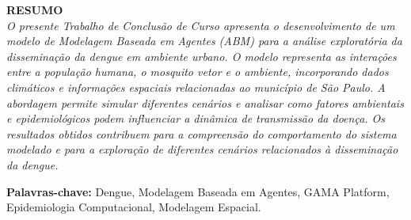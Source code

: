 \documentclass[
    12pt,
    openright,
    oneside,
    a4paper,
    english,
    brazil
]{abntex2}
\begin{document}
\frenchspacing


\imprimircapa


\imprimirfolhaderosto\*
\cleardoublepage

\begin{resumo}

\vspace{8cm}

\begin{center}
\textbf{RESUMO}\\[0.5cm]
\textit{O presente Trabalho de Conclusão de Curso apresenta o desenvolvimento de um modelo de Modelagem Baseada em Agentes (ABM) para a análise exploratória da disseminação da dengue em ambiente urbano. O modelo representa as interações entre a população humana, o mosquito vetor e o ambiente, incorporando dados climáticos e informações espaciais relacionadas ao município de São Paulo. A abordagem permite simular diferentes cenários e analisar como fatores ambientais e epidemiológicos podem influenciar a dinâmica de transmissão da doença. Os resultados obtidos contribuem para a compreensão do comportamento do sistema modelado e para a exploração de diferentes cenários relacionados à disseminação da dengue.}
\end{center}

\vspace{6cm}

\textbf{Palavras-chave:} Dengue, Modelagem Baseada em Agentes, GAMA Platform, Epidemiologia Computacional, Modelagem Espacial.

\end{resumo}
\cleardoublepage
\end{document}
